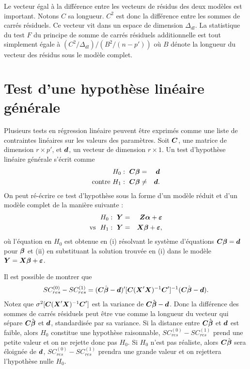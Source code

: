 Le vecteur égal à la différence entre les vecteurs de résidus des
deux mod\`eles est important. Notons $C$ sa longueur. $C^2$ est donc la différence entre les sommes
de carrés résiduels. Ce vecteur vit dans un espace de
dimension $\Delta_{dl}$. La statistique du test $F$ du principe de
somme de carrés résiduels additionnelle est tout simplement
égale \`a $(C^2/\Delta_{dl})/(B^2/(n-p'))$ où $B$ dénote la longueur du vecteur des résidus sous le modèle complet.

\section{Test d'une hypoth\`ese linéaire générale}
\label{sec:hyplingen}

Plusieurs tests en régression linéaire peuvent être exprimés comme une liste de contraintes linéaires sur les valeurs des param\`etres. Soit $\bo{C}$, une matrice de dimension
$r\times p'$, et $\bo{d}$, un vecteur de dimension $r\times1$. Un test d'hypoth\`ese linéaire
générale s'écrit comme
\begin{eqnarray}\label{H0:lingen}
H_0:~\bo{C}\bobeta&=&\bo{d}\\
\mbox{contre\ }H_1:~\bo{C}\bobeta&\neq&\bo{d}.\nonumber
\end{eqnarray}
On peut ré-écrire ce test d'hypoth\`ese sous la forme d'un mod\`ele réduit et d'un mod\`ele
complet de la manière suivante :
\begin{eqnarray*}
H_0:~\boY&=&\bo{Z}\bo{\alpha}+\boeps\\
\mbox{vs\ \ }H_1:~\boY&=&\boX\bobeta+\boeps,
\end{eqnarray*}
où l'équation en $H_0$ est obtenue en (i) résolvant le système d'équations
$\bo{C}\bobeta=\bo{d}$ pour $\bobeta$ et (ii) en substituant la solution trouvée en (i)
dans le modèle $\boY=\boX\bobeta+\boeps$.

Il est possible de
montrer \citep[voir par e.g.][pp. 44--45 et pp. 60--64]{Sen_Sri:90} que
$$SC_{res}^{(0)}-SC_{res}^{(1)}=(\bo{C}\hbobeta-\bo{d})'[\bo{C}(\boX'\boX)^{-1}\bo{C}']^{-1}(\bo{C}
\hbobeta-\bo{d}).$$
Notez que $\sigma^2[\bo{C}(\boX'\boX)^{-1}\bo{C}']$ est la variance de $\bo{C}\hbobeta-\bo{d}$. Donc
la différence des sommes de carrés résiduels peut \^etre vue comme la longueur du vecteur
qui sépare $\bo{C}\hbobeta$ et $\bo{d}$, standardisée par sa variance. Si la distance entre
$\bo{C}\hbobeta$ et $\bo{d}$ est faible, alors $H_0$ constitue une hypothèse raisonnable, $SC_{res}^{(0)}-
SC_{res}^{(1)}$ prend une petite valeur et on ne rejette donc pas $H_0$. Si $H_0$ n'est pas réaliste, alors
$\bo{C}\hbobeta$ sera éloignée de $\bo{d}$, $SC_{res}^{(0)}-SC_{res}^{(1)}$ prendra une grande valeur
et on rejettera l'hypothèse nulle $H_0$.


